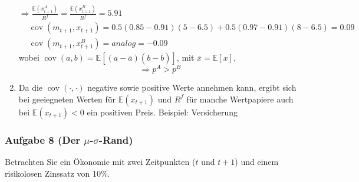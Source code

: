 \documentclass[12pt]{extreport} %
\theoremstyle{named}
\theoremstyle{nnamed}
\theoremstyle{itshape}
\theoremstyle{normal}
\begin{document}
\begin{enumerate}
		$\Rightarrow \frac{\mathbb{E}(x_{t+1}^A)}{R^f} = \frac{\mathbb{E}(x_{t+1}^B)}{R^f} = 5.91$
		\begin{align*}
			& \operatorname{cov}(m_{t+1}, x_{t+1}) = 0.5 \left( 0.85 - 0.91 \right) \left( 5 - 6.5 \right) + 0.5 \left(0.97 - 0.91 \right) \left( 8 - 6.5 \right) = 0.09 \\
			& \operatorname{cov}(m_{t+1}, x_{t+1}^B) = analog = -0.09 
		\end{align*}
		wobei $\operatorname{cov}(a, b) = \mathbb{E}[(a - \overline{a})(b - \overline{b})]$, mit $\overline{x} = \mathbb{E}[x]$, 
	$$\Rightarrow p^A > p^B$$
	\item Da die $\operatorname{cov}(\cdot, \cdot)$ negative sowie positive Werte annehmen kann, ergibt sich bei geeiegneten Werten für $\mathbb{E}(x_{t+1})$ und $R^f$ für manche Wertpapiere auch bei $\mathbb{E}(x_{t+1}) < 0$ ein positiven Preis. Beispiel: Versicherung
\end{enumerate}

\newpage

\subsubsection*{Aufgabe 8 (Der $\mu$-$\sigma$-Rand)}

Betrachten Sie ein Ökonomie mit zwei Zeitpunkten ($t$ und $t+1$) und einem risikolosen Zinssatz von 10\%.
\end{document}
